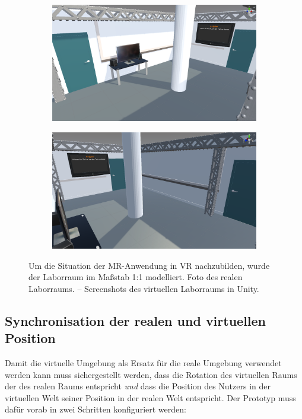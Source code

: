 \begin{figure}
    \vspace{1em}
    \begin{subfigure}{0.49\textwidth}
        \includegraphics[width=\textwidth]{figures/lab1}
        \caption{}
        \label{sfig:lab_screenshot_2}
    \end{subfigure}
    \hfill
    \begin{subfigure}{0.49\textwidth}
        \includegraphics[width=\textwidth]{figures/lab2}
        \caption{}
        \label{sfig:lab_screenshot_3}
    \end{subfigure}
    \caption{Um die Situation der MR-Anwendung in VR nachzubilden, wurde der Laborraum im Maßstab 1:1 modelliert. %
              Foto des realen Laborraums. %
             -- Screenshots des virtuellen Laborraums in Unity.%
	}
	\label{fig:lab_environment}
\end{figure}

\subsection*{Synchronisation der realen und virtuellen Position}
Damit die virtuelle Umgebung als Ersatz für die reale Umgebung verwendet werden kann muss sichergestellt werden, dass die Rotation des virtuellen Raums der des realen Raums entspricht \emph{und} dass die Position des Nutzers in der virtuellen Welt seiner Position in der realen Welt entspricht.
Der Prototyp muss dafür vorab in zwei Schritten konfiguriert werden:

